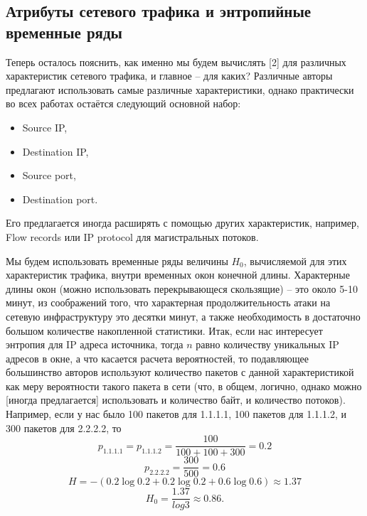 \documentclass[]{interact}
\theoremstyle{plain}%
\theoremstyle{definition}
\theoremstyle{remark}
\begin{document}
\subsection{Атрибуты сетевого трафика и энтропийные временные ряды}

Теперь осталось пояснить, как именно мы будем вычислять [2] для различных характеристик сетевого трафика, и главное -- для каких?
Различные авторы предлагают использовать самые различные характеристики, однако практически во всех работах остаётся следующий основной набор:
\begin{itemize}
    \item Source IP,
    \item Destination IP,
    \item Source port,
    \item Destination port.
\end{itemize}
 Его предлагается иногда расширять с помощью других характеристик, например, Flow records или IP protocol для магистральных потоков.

 Мы будем использовать временные ряды величины $H_0$, вычисляемой для этих характеристик трафика, внутри временных окон конечной длины. Характерные длины окон (можно использовать перекрывающеся скользящие) -- это около 5-10 минут, из соображений того, что характерная продолжительность атаки на сетевую инфраструктуру это десятки минут, а также необходимость в достаточно большом количестве накопленной статистики.
 Итак, если нас интересует энтропия для IP адреса источника, тогда $n$ равно количеству уникальных IP адресов в окне, а что касается расчета вероятностей, то подавляющее большинство авторов используют количество пакетов с данной характеристикой как меру вероятности такого пакета в сети (что, в общем, логично, однако можно [иногда предлагается] использовать и количество байт, и количество потоков). Например, если у нас было 100 пакетов для 1.1.1.1, 100 пакетов для 1.1.1.2, и 300 пакетов для 2.2.2.2, то
 \begin{equation}
     p_{1.1.1.1} = p_{1.1.1.2} = \frac{100}{100 + 100 + 300} = 0.2
 \end{equation}
 \begin{equation}
     p_{2.2.2.2} = \frac{300}{500} = 0.6
 \end{equation}
 \begin{equation}
     H = -(0.2 \log 0.2 + 0.2 \log 0.2 + 0.6 \log 0.6) \approx 1.37
 \end{equation}
 \begin{equation}
     H_0 = \frac{1.37}{log 3} \approx 0.86.
 \end{equation}
\end{document}
